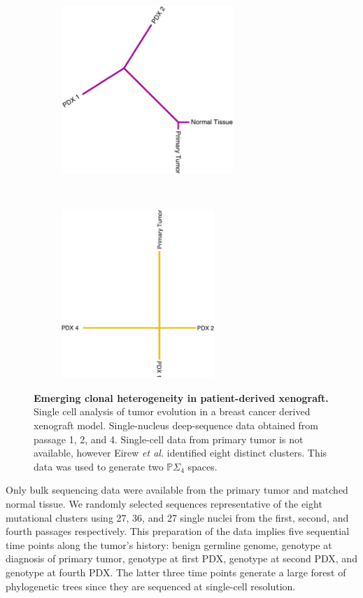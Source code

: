 \documentclass[a4paper,11pt]{article}
\begin{document}
\begin{figure}
    \begin{subfigure}{0.5\linewidth}
    \centering
    \includegraphics[height=2.5in]{../figures/xenograft_tree_purple.pdf}
    \end{subfigure}
    ~
    \begin{subfigure}{0.5\linewidth}
    \centering
    \includegraphics[height=2.5in]{../figures/xenograft_tree_gold.pdf}
    \end{subfigure}

    \caption{{\bf Emerging clonal heterogeneity in patient-derived xenograft.} Single cell analysis of tumor evolution in a breast cancer derived xenograft model. Single-nucleus deep-sequence data obtained from passage 1, 2, and 4. Single-cell data from primary tumor is not available, however Eirew \textit{et al.} identified eight distinct clusters. This data was used to generate two $\mathbb{P}\Sigma_4 $ spaces.}
    \label{fig:xenograft}
\end{figure} 

Only bulk sequencing data were available from the primary tumor and matched normal tissue.
We randomly selected sequences representative of the eight mutational clusters using 27, 36, and 27 single nuclei from the first, second, and fourth passages respectively.
This preparation of the data implies five sequential time points along the tumor's history: benign germline genome, genotype at diagnosis of primary tumor, genotype at first PDX, genotype at second PDX, and genotype at fourth PDX.
The latter three time points generate a large forest of phylogenetic trees since they are sequenced at single-cell resolution.
\end{document}
